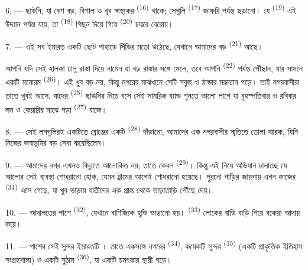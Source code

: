 \VUsaut{5.0mm}
\VUsaut{3.4mm}

6. --- ছাউনি, যা বেশ বড়, বিশাল ও খুব স্বাস্থ্যকর 
\textsuperscript{(16)} থাকে; সেগুলি  \textsuperscript{(17)}
জাফরি পর্যন্ত ছড়ানো। যে  \textsuperscript{(19)} এই
উদ্যান পর্যন্ত যায়, তা  \textsuperscript{(18)} পিছন দিয়ে
গিয়ে  \textsuperscript{(20)} চত্বরে বেরোয়।

7. --- এই সব ইমারত একটি ছোট পাহাড়ে সিঁড়ির মতো উঠেছে, যেখানে আমাদের বড়
 \textsuperscript{(21)} আছে।

আপনি যদি সেই হালকা ঢালু রাস্তা দিয়ে নামেন যা বড় রাস্তার সঙ্গে মেলে, তবে আপনি
 \textsuperscript{(22)} পর্যন্ত পৌঁছান, যার সামনে একটি মনোরম
 \textsuperscript{(26)}। এই  খুব বড় নয়,
কিন্তু নগরের মাঝখানে সেটি সবুজ ও ঠান্ডার মরূদ্যান গড়ে। তাই নগরবাসীরা তাতে
খুবই আসে, যাদের  \textsuperscript{(25)} ছাউনির নিচে বসে সেই
সামরিক ব্যান্ড শুনতে ভালো লাগে যা বৃহস্পতিবার ও রবিবার লন ও কেয়ারির মাঝে গড়া
 \textsuperscript{(27)} বাজে।

8. --- সেই লনগুলিরই একটিতে ব্রোঞ্জের একটি  \textsuperscript{(28)}
দাঁড়ানো, আমাদের এক নগরবাসীর স্মৃতিতে তোলা স্মারক, যিনি নিজের জন্মভূমির বড়
সেবা করেছিলেন।

\VUsaut{4.0mm}
\VUsaut{3.4mm}

9. --- আমাদের নগর এখনও বিদ্যুতে আলোকিত নয়; তাতে কেবল 
\textsuperscript{(29)}। কিন্তু  এই নিয়ে অভিযান চালাচ্ছে
যে আলোর সেই ব্যবস্থা শোধরানো হোক, যেমন ট্রামের  আগেই
শোধরানো হয়েছে।   পুরনো গাড়ির জায়গায় এখন
কাজের  \textsuperscript{(31)} এসে গেছে, যা খুব
 ভাড়ায় যাত্রীদের  এক প্রান্ত থেকে  তাড়াতাড়ি পৌঁছে দেয়।

10. --- আদালতের পাশে  \textsuperscript{(32)}, যেখানে বাণিজ্যিক
হুন্ডি ভাঙানো হয়।  \textsuperscript{(33)} লোকের
বাড়ি বাড়ি গিয়ে বকেয়া আদায় করে।

\VUsaut{4.0mm}
\VUsaut{3.4mm}

11. --- পাশের সেই সুন্দর ইমারতটি । তাতে একসঙ্গে নগরের
 \textsuperscript{(34)}, কয়েকটি সুন্দর  \textsuperscript{(35)} (একটি প্রাকৃতিক ইতিহাস সংগ্রহশালা) ও
একটি সুঠাম  \textsuperscript{(36)}, যা একটি চমৎকার স্থায়ী
 গড়ে।

